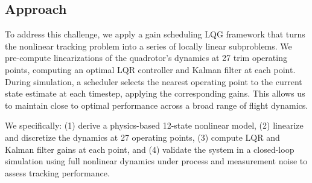 \documentclass[11pt]{amsart}
\begin{document}
\subsection{Approach}
To address this challenge, we apply a gain scheduling LQG framework that turns the nonlinear tracking problem into a series of locally linear subproblems. We pre-compute linearizations of the quadrotor's dynamics at 27 trim operating points, computing an optimal LQR controller and Kalman filter at each point. During simulation, 
a scheduler selects the nearest operating point to the current state estimate at each timestep, applying the corresponding gains. This allows us to maintain close to optimal performance across a broad range of flight dynamics.

We specifically: (1) derive a physics-based 12-state nonlinear model, (2) linearize and discretize the dynamics at 27 operating points, (3) compute LQR and Kalman filter gains at each point, and (4) validate the system in a closed-loop simulation using full nonlinear dynamics under process and measurement noise to assess tracking performance.


\end{document}
